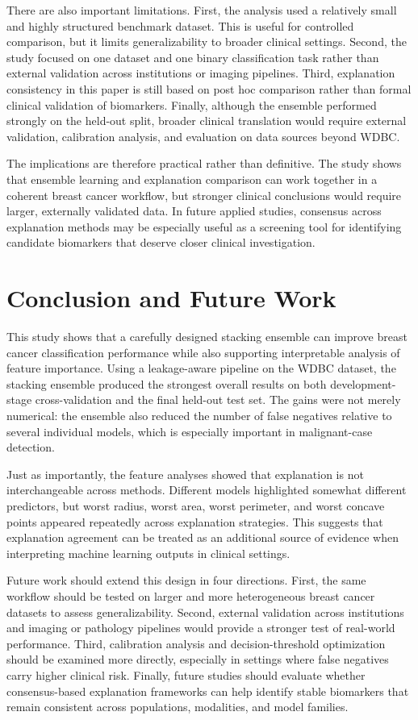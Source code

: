 \documentclass[conference]{IEEEtran}
\begin{document}
There are also important limitations. First, the analysis used a relatively small and highly structured benchmark dataset. This is useful for controlled comparison, but it limits generalizability to broader clinical settings. Second, the study focused on one dataset and one binary classification task rather than external validation across institutions or imaging pipelines. Third, explanation consistency in this paper is still based on post hoc comparison rather than formal clinical validation of biomarkers. Finally, although the ensemble performed strongly on the held-out split, broader clinical translation would require external validation, calibration analysis, and evaluation on data sources beyond WDBC.

The implications are therefore practical rather than definitive. The study shows that ensemble learning and explanation comparison can work together in a coherent breast cancer workflow, but stronger clinical conclusions would require larger, externally validated data. In future applied studies, consensus across explanation methods may be especially useful as a screening tool for identifying candidate biomarkers that deserve closer clinical investigation.

\section{Conclusion and Future Work}
This study shows that a carefully designed stacking ensemble can improve breast cancer classification performance while also supporting interpretable analysis of feature importance. Using a leakage-aware pipeline on the WDBC dataset, the stacking ensemble produced the strongest overall results on both development-stage cross-validation and the final held-out test set. The gains were not merely numerical: the ensemble also reduced the number of false negatives relative to several individual models, which is especially important in malignant-case detection.

Just as importantly, the feature analyses showed that explanation is not interchangeable across methods. Different models highlighted somewhat different predictors, but worst radius, worst area, worst perimeter, and worst concave points appeared repeatedly across explanation strategies. This suggests that explanation agreement can be treated as an additional source of evidence when interpreting machine learning outputs in clinical settings.

Future work should extend this design in four directions. First, the same workflow should be tested on larger and more heterogeneous breast cancer datasets to assess generalizability. Second, external validation across institutions and imaging or pathology pipelines would provide a stronger test of real-world performance. Third, calibration analysis and decision-threshold optimization should be examined more directly, especially in settings where false negatives carry higher clinical risk. Finally, future studies should evaluate whether consensus-based explanation frameworks can help identify stable biomarkers that remain consistent across populations, modalities, and model families.
\end{document}
